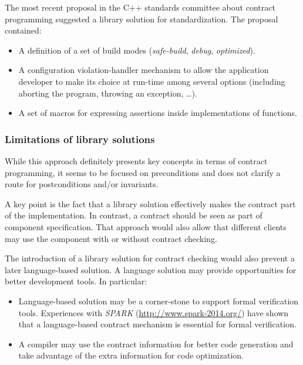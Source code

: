The most recent proposal \cite{n3997} in the C++ standards committee about contract programming suggested a
library solution for standardization. The proposal contained:

\begin{itemize}

\item A definition of a set of build modes (\emph{safe-build}, \emph{debug},
\emph{optimized}).

\item A configuration violation-handler mechanism to allow the application
developer to make its choice at run-time among several options (including
aborting the program, throwing an exception, \ldots).

\item A set of macros for expressing assertions inside implementations of
functions.

\end{itemize}

\subsubsection{Limitations of library solutions}

While this approach definitely presents key concepts in terms of contract
programming, it seems to be focused on preconditions and does not clarify a
route for postconditions and/or invariants.

A key point is the fact that a library solution effectively makes the contract
part of the implementation. In contrast, a contract should be seen as part of
component specification. That approach would also allow that different clients
may use the component with or without contract checking.

The introduction of a library solution for contract checking would also prevent
a later language-based solution. A language solution may provide opportunities
for better development tools. In particular:

\begin{itemize}

\item Language-based solution may be a corner-stone to support formal
verification tools. Experiences with \emph{SPARK}
(\url{http://www.spark-2014.org/}) have shown that a language-based contract
mechanism is essential for formal verification.

\item A compiler may use the contract information for better code generation and
take advantage of the extra information for code optimization.

\end{itemize}

